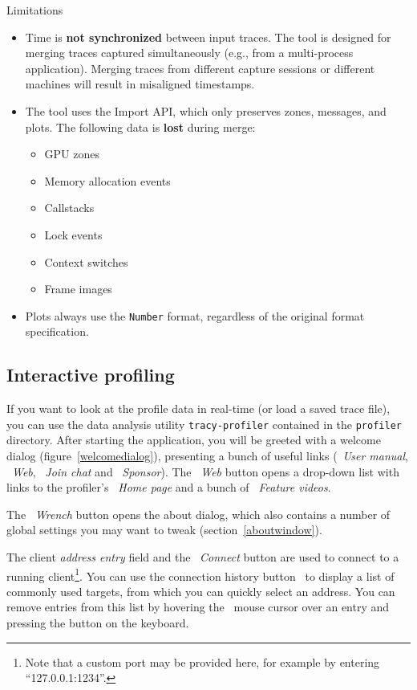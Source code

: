 \documentclass[hidelinks,titlepage,a4paper,twoside]{article}
\begin{document}
\begin{bclogo}[
noborder=true,
couleur=black!5,
logo=\bcattention
]{Limitations}
\begin{itemize}
\item Time is \textbf{not synchronized} between input traces. The tool is designed for merging traces captured simultaneously (e.g., from a multi-process application). Merging traces from different capture sessions or different machines will result in misaligned timestamps.
\item The tool uses the Import API, which only preserves zones, messages, and plots. The following data is \textbf{lost} during merge:
  \begin{itemize}
    \item GPU zones
    \item Memory allocation events
    \item Callstacks
    \item Lock events
    \item Context switches
    \item Frame images
  \end{itemize}
\item Plots always use the \texttt{Number} format, regardless of the original format specification.
\end{itemize}
\end{bclogo}

\subsection{Interactive profiling}
\label{interactiveprofiling}

If you want to look at the profile data in real-time (or load a saved trace file), you can use the data analysis utility \texttt{tracy-profiler} contained in the \texttt{profiler} directory. After starting the application, you will be greeted with a welcome dialog (figure~\ref{welcomedialog}), presenting a bunch of useful links (\faBook{}~\emph{User manual}, \faEarthAmericas{}~\emph{Web}, \faComments~\emph{Join chat} and \faHeart{}~\emph{Sponsor}). The \faEarthAmericas{}~\emph{Web} button opens a drop-down list with links to the profiler's \emph{\faHouseChimney{}~Home page} and a bunch of \emph{\faVideo{}~Feature videos}.

The \emph{\faWrench{}~Wrench} button opens the about dialog, which also contains a number of global settings you may want to tweak (section~\ref{aboutwindow}).

The client \emph{address entry} field and the \faWifi{}~\emph{Connect} button are used to connect to a running client\footnote{Note that a custom port may be provided here, for example by entering \enquote{127.0.0.1:1234}.}. You can use the connection history button~\faCaretDown{} to display a list of commonly used targets, from which you can quickly select an address. You can remove entries from this list by hovering the \faArrowPointer{}~mouse cursor over an entry and pressing the \keys{\del} button on the keyboard.
\end{document}
